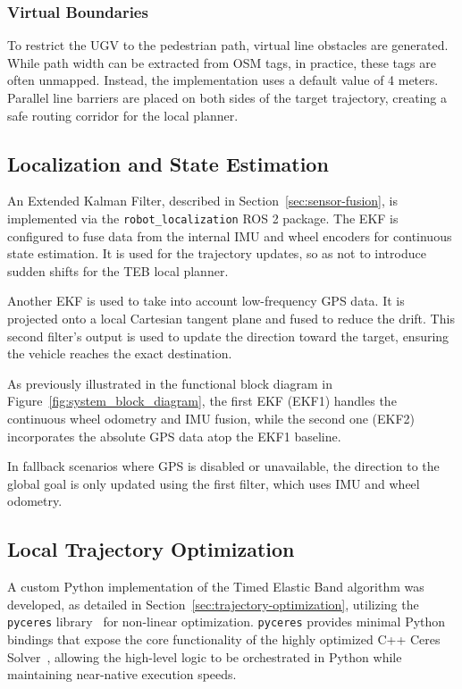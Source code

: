 \subsubsection{Virtual Boundaries}
\label{subsubsec:virtual-boundaries}
To restrict the UGV to the pedestrian path, virtual line obstacles are generated. While path width can be extracted from OSM tags, in practice, these tags are often unmapped. Instead, the implementation uses a default value of 4 meters. Parallel line barriers are placed on both sides of the target trajectory, creating a safe routing corridor for the local planner.

\subsection{Localization and State Estimation}
\label{subsec:localization-impl}

An Extended Kalman Filter, described in Section~\ref{sec:sensor-fusion}, is implemented via the \texttt{robot\_localization} ROS 2 package. The EKF is configured to fuse data from the internal IMU and wheel encoders for continuous state estimation. It is used for the trajectory updates, so as not to introduce sudden shifts for the TEB local planner.

Another EKF is used to take into account low-frequency GPS data. It is projected onto a local Cartesian tangent plane and fused to reduce the drift. This second filter's output is used to update the direction toward the target, ensuring the vehicle reaches the exact destination.

As previously illustrated in the functional block diagram in Figure~\ref{fig:system_block_diagram}, the first EKF (EKF1) handles the continuous wheel odometry and IMU fusion, while the second one (EKF2) incorporates the absolute GPS data atop the EKF1 baseline.

In fallback scenarios where GPS is disabled or unavailable, the direction to the global goal is only updated using the first filter, which uses IMU and wheel odometry.

\subsection{Local Trajectory Optimization}
\label{subsec:teb-impl}

A custom Python implementation of the Timed Elastic Band algorithm was developed, as detailed in Section~\ref{sec:trajectory-optimization}, utilizing the \texttt{pyceres} library~\cite{sarlin2025pyceres} for non-linear optimization. \texttt{pyceres} provides minimal Python bindings that expose the core functionality of the highly optimized C++ Ceres Solver~\cite{agarwal2012ceres}, allowing the high-level logic to be orchestrated in Python while maintaining near-native execution speeds.

